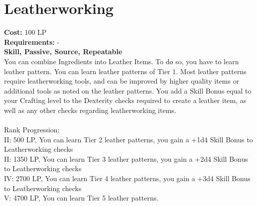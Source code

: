 \section{Leatherworking}\label{perk:leatherworking}
\textbf{Cost:} 100 LP\\
\textbf{Requirements:} -\\
\textbf{Skill, Passive, Source, Repeatable}\\
You can combine Ingredients into Leather Items.
To do so, you have to learn leather pattern.
You can learn leather patterns of Tier 1.
Most leather patterns require leatherworking tools, and can be improved by higher quality items or additional tools as noted on the leather patterns.
You add a Skill Bonus equal to your Crafting level to the Dexterity checks required to create a leather item, as well as any other checks regarding leatherworking items.\\
\\
Rank Progression:\\
II: 500 LP, You can learn Tier 2 leather patterns, you gain a +1d4 Skill Bonus to Leatherworking checks\\
II: 1350 LP, You can learn Tier 3 leather patterns, you gain a +2d4 Skill Bonus to Leatherworking checks\\
IV: 2700 LP, You can learn Tier 4 leather patterns, you gain a +3d4 Skill Bonus to Leatherworking checks\\
V: 4700 LP, You can learn Tier 5 leather patterns.\\